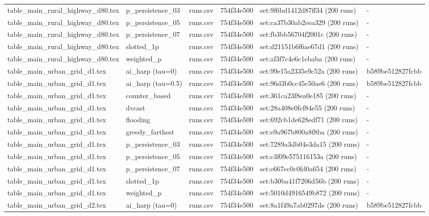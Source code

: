 \begin{tabular}{llllll}
table\_main\_rural\_highway\_d80.tex & p\_persistence\_03 & runs.csv & 754f34e500 & set:9f6bd1412d87ff34 (200 runs) & - \\
table\_main\_rural\_highway\_d80.tex & p\_persistence\_05 & runs.csv & 754f34e500 & set:ca37b30ab2eea329 (200 runs) & - \\
table\_main\_rural\_highway\_d80.tex & p\_persistence\_07 & runs.csv & 754f34e500 & set:fb3bb56704f2001c (200 runs) & - \\
table\_main\_rural\_highway\_d80.tex & slotted\_1p & runs.csv & 754f34e500 & set:d21151b6f6ae67d1 (200 runs) & - \\
table\_main\_rural\_highway\_d80.tex & weighted\_p & runs.csv & 754f34e500 & set:af3f7c4e6c1ebaba (200 runs) & - \\
table\_main\_urban\_grid\_d1.tex & ai\_harp (tau=0) & runs.csv & 754f34e500 & set:99e15a2335e9c52a (200 runs) & b589be512827fcbb \\
table\_main\_urban\_grid\_d1.tex & ai\_harp (tau=0.5) & runs.csv & 754f34e500 & set:96d3b0cc45c50ae6 (200 runs) & b589be512827fcbb \\
table\_main\_urban\_grid\_d1.tex & counter\_based & runs.csv & 754f34e500 & set:361ca23f8ea0e185 (200 runs) & - \\
table\_main\_urban\_grid\_d1.tex & dvcast & runs.csv & 754f34e500 & set:28a408e0fcf84e55 (200 runs) & - \\
table\_main\_urban\_grid\_d1.tex & flooding & runs.csv & 754f34e500 & set:692cb1de628edf71 (200 runs) & - \\
table\_main\_urban\_grid\_d1.tex & greedy\_farthest & runs.csv & 754f34e500 & set:e9a967b800a8f8ba (200 runs) & - \\
table\_main\_urban\_grid\_d1.tex & p\_persistence\_03 & runs.csv & 754f34e500 & set:7289a3db04e3da15 (200 runs) & - \\
table\_main\_urban\_grid\_d1.tex & p\_persistence\_05 & runs.csv & 754f34e500 & set:c3f09e575116153a (200 runs) & - \\
table\_main\_urban\_grid\_d1.tex & p\_persistence\_07 & runs.csv & 754f34e500 & set:e667ec0c0fd0a654 (200 runs) & - \\
table\_main\_urban\_grid\_d1.tex & slotted\_1p & runs.csv & 754f34e500 & set:b30ba41f7206d56b (200 runs) & - \\
table\_main\_urban\_grid\_d1.tex & weighted\_p & runs.csv & 754f34e500 & set:5010d4916549b872 (200 runs) & - \\
table\_main\_urban\_grid\_d2.tex & ai\_harp (tau=0) & runs.csv & 754f34e500 & set:8a1f49a7ab0297de (200 runs) & b589be512827fcbb \\

\end{tabular}
